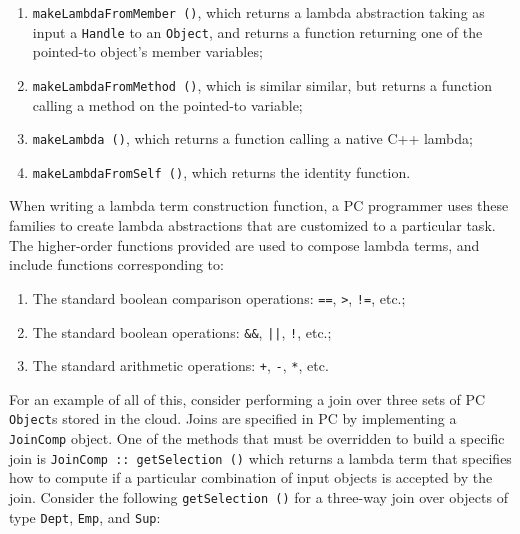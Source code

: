 \begin{enumerate}

\vspace{-5pt}
\item \texttt{makeLambdaFromMember ()}, which returns 
a lambda abstraction taking as input a \texttt{Handle} to an \texttt{Object}, and returns a function returning one of the pointed-to object's member variables;

\vspace{-5pt}
\item 
\texttt{makeLambdaFromMethod ()}, which is similar similar, but returns a function calling a method on the pointed-to variable;

\vspace{-5pt}
\item \texttt{makeLambda ()}, which returns a function calling
a native C++ lambda;

\vspace{-5pt}
\item \texttt{makeLambdaFromSelf ()}, which returns the identity function.

\end{enumerate}

\vspace{-5pt}
\noindent
When writing a lambda term construction function, a PC programmer uses these families to create lambda abstractions that
are customized to a particular task.
The higher-order functions provided are used to compose lambda terms, and
include functions corresponding to:

\begin{enumerate}
\vspace{-5pt}
\item
The standard boolean comparison operations: \texttt{==}, \texttt{>}, \texttt{!=}, etc.;

\vspace{-5pt}
\item
The standard boolean
operations: \texttt{\&\&}, \texttt{||}, \texttt{!}, etc.;

\vspace{-5pt}
\item
The standard arithmetic operations: \texttt{+}, \texttt{-}, \texttt{*}, etc.  
\end{enumerate}

For an example of all of this, consider performing a join over three sets of PC \texttt{Object}s stored in the cloud.  
Joins are specified in PC 
by implementing a \texttt{JoinComp} object. One of the methods that must be overridden to build a specific join is \texttt{JoinComp :: getSelection ()}
which returns a lambda term
that specifies how to compute if a particular combination of input objects is accepted by the join.  Consider the following
\texttt{getSelection ()} for a three-way join over objects of type \texttt{Dept}, \texttt{Emp}, and \texttt{Sup}:



